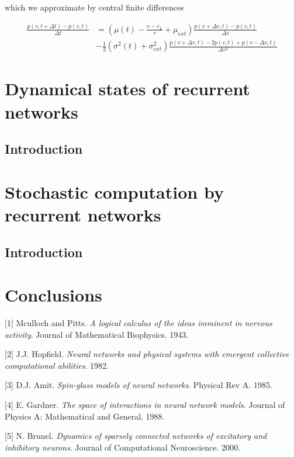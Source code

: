 \documentclass{ucetd}
\begin{document}
which we approximate by central finite differences

\begin{align*}
\frac{p(v, t+\Delta t) - p(v,t)}{\Delta t} &= \left(\mu(t) - \frac{v-v_{L}}{\tau}+ \mu_{ext}\right)\frac{p(v+\Delta v, t) - p(v,t)}{\Delta v} \\
&- \frac{1}{2}\left(\sigma^{2}(t) + \sigma_{ext}^{2}\right)\frac{p(v+\Delta v, t) - 2p(v,t) + p(v-\Delta v, t)}{\Delta v^{2}}
\end{align*} 


\chapter{Dynamical states of recurrent networks}
\section{Introduction}


\chapter{Stochastic computation by recurrent networks}
\section{Introduction}

\chapter{Conclusions}


\makebibliography

[1] Mculloch and Pitts. \textit{A logical calculus of the ideas imminent in nervous activity}. Journal of Mathematical Biophysics. 1943.

[2] J.J. Hopfield. \textit{Neural networks and physical systems with emergent collective computational abilities}. 1982.

[3] D.J. Amit. \textit{Spin-glass models of neural networks}. Physical Rev A. 1985.

[4] E. Gardner. \textit{The space of interactions in neural network models}. Journal of Physics A: Mathematical and General. 1988.

[5] N. Brunel. \textit{Dynamics of sparsely connected networks of excitatory and inhibitory neurons}. Journal of Computational Neuroscience. 2000. 
\end{document}
